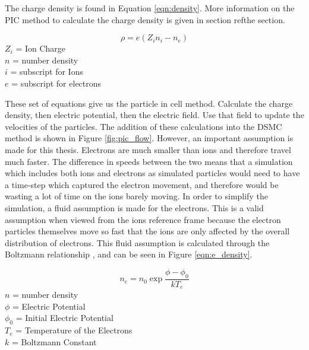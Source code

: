 \indent The charge density is found in Equation \ref{eqn:density}. More information on the PIC method to calculate the charge density is given in section ref{the section}. \par

\begin{equation}
    \label{eqn:density}
    \rho = e(Z_i n_i - n_e)
\end{equation}
\(Z_i\) = Ion Charge \\
\(n\) = number density \\
\(i\) = subscript for Ions \\
\(e\) = subscript for electrons \par

\indent These set of equations give us the particle in cell method. Calculate the charge density, then electric potential, then the electric field. Use that field to update the velocities of the particles. The addition of these calculations into the DSMC method is shown in Figure \ref{fig:pic_flow}. However, an important assumption is made for this thesis. Electrons are much smaller than ions and therefore travel much faster. The difference in speeds between the two means that a simulation which includes both ions and electrons as simulated particles would need to have a time-step which captured the electron movement, and therefore would be wasting a lot of time on the ions barely moving. In order to simplify the simulation, a fluid assumption is made for the electrons. This is a valid assumption when viewed from the ions reference frame because the electron particles themselves move so fast that the ions are only affected by the overall distribution of electrons. This fluid assumption is calculated through the Boltzmann relationship \cite{es-pic}, and can be seen in Figure \ref{eqn:e_density}.


\begin{equation}
    \label{eqn:e_density}
    n_e = n_0 \exp{\frac{\phi - \phi_0}{k T_e}}
\end{equation}
\(n\) = number density \\
\(\phi\) = Electric Potential \\
\(\phi_0\) = Initial Electric Potential \\
\(T_e\) = Temperature of the Electrons \\
\(k\) = Boltzmann Constant \par



